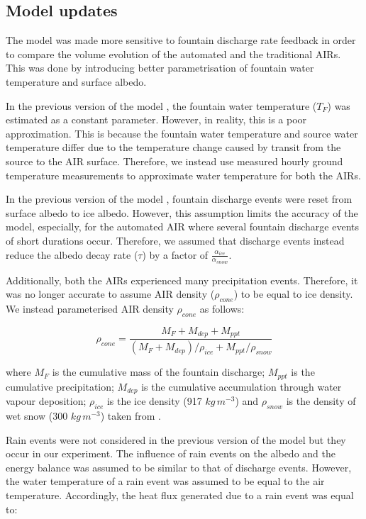 \documentclass[tc, manuscript]{copernicus}
\begin{document}
\subsection{Model updates}

The model was made more sensitive to fountain discharge rate feedback in order to compare the volume evolution
of the automated and the traditional AIRs. This was done by introducing better parametrisation of fountain water
temperature and surface albedo. 

In the previous version of the model \citep{balasubramanianInfluenceMeteorologicalConditions2022}, the fountain
water temperature ($T_F$) was estimated as a constant parameter. However, in reality, this is a poor
approximation. This is because the fountain water temperature and source water temperature differ due to the
temperature change caused by transit from the source to the  AIR surface. Therefore, we instead use measured
hourly ground temperature measurements to approximate water temperature for both the AIRs.

In the previous version of the model \citep{balasubramanianInfluenceMeteorologicalConditions2022}, fountain
discharge events were reset from surface albedo to ice albedo. However, this assumption limits the accuracy of
the model, especially, for the automated AIR where several fountain discharge events of short durations occur.
Therefore, we assumed that discharge events instead reduce the albedo decay rate ($\tau$) by a 
factor of $\frac{\alpha_{ice}}{\alpha_{snow}}$.

Additionally, both the AIRs experienced many precipitation events. Therefore, it was no longer accurate to
assume AIR density ($\rho_{cone}$) to be equal to ice density. We instead parameterised AIR density $\rho_{cone}$ as follows:

\begin{equation}
  \rho_{cone} = \frac{M_{F} + M_{dep} + M_{ppt}}{(M_{F} + M_{dep})/\rho_{ice} + M_{ppt}/\rho_{snow}}
\end{equation}

where $M_F$ is the cumulative mass of the fountain discharge; $M_{ppt}$ is the cumulative precipitation;
$M_{dep}$ is the cumulative accumulation through water vapour deposition; $\rho_{ice}$ is the ice density (917
$kg\,m^{-3}$) and $\rho_{snow}$ is the density of wet snow (300 $kg\,m^{-3}$) taken from
\cite{cuffeyPhysicsGlaciers2010} .

Rain events were not considered in the previous version of the model but they occur in our experiment. The
influence of rain events on the albedo and the energy balance was assumed to be similar to that of discharge
events. However, the water temperature of a rain event was assumed to be equal to the air temperature.
Accordingly, the heat flux generated due to a rain event was equal to:
\end{document}
